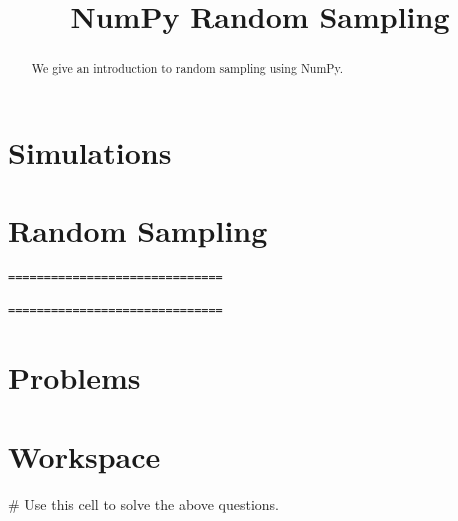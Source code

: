\documentclass{ximera}
\title{NumPy Random Sampling}
\begin{document}
  
\begin{abstract}  
We give an introduction to random sampling using NumPy.
\end{abstract}  
\maketitle

\section{Simulations}



\section{Random Sampling}

\begin{verbatim}
==============================

==============================
\end{verbatim}


\section{Problems}

\begin{question}
\end{question}

\begin{question}
\end{question}

\begin{question}
\end{question}

\section{Workspace}

\begin{sageCell}
# Use this cell to solve the above questions.
\end{sageCell}
\end{document}
